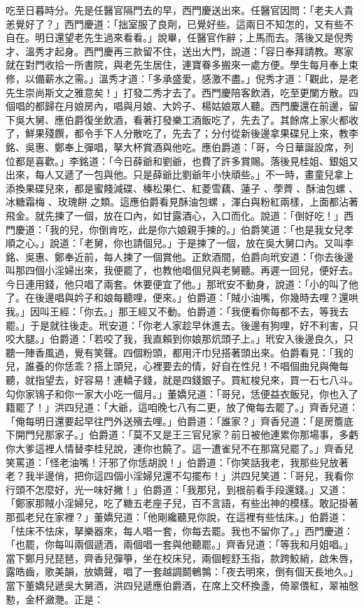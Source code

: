吃至日暮時分。先是任醫官隔門去的早，西門慶送出來。任醫官因問：「老夫人貴恙覺好了？」西門慶道：「拙室服了良劑，已覺好些。這兩日不知怎的，又有些不自在。明日還望老先生過來看看。」說畢，任醫官作辭；上馬而去。落後又是倪秀才、溫秀才起身。西門慶再三款留不住，送出大門，說道：「容日奉拜請教。寒家就在對門收拾一所書院，與老先生居住，連寶眷多搬來一處方便。學生每月奉上束修，以備薪水之需。」溫秀才道：「多承盛愛，感激不盡。」倪秀才道：「觀此，是老先生崇尚斯文之雅意矣！」打發二秀才去了。西門慶陪客飲酒，吃至更闌方散。四個唱的都歸在月娘房內，唱與月娘、大妗子、楊姑娘眾人聽。西門慶還在前邊，留下吳大舅、應伯爵復坐飲酒，看著打發樂工酒飯吃了，先去了。其餘席上家火都收了，鮮果殘饌，都令手下人分散吃了，先去了；分付從新後邊拿果碟兒上來，教李銘、吳惠、鄭奉上彈唱，拏大杯賞酒與他吃。應伯爵道：「哥，今日華誕設席，列位都是喜歡。」李銘道：「今日薛爺和劉爺，也費了許多賞賜。落後見桂姐、銀姐又出來，每人又遞了一包與他。只是薛爺比劉爺年小快頑些。」不一時，畫童兒拿上添換果碟兒來，都是蜜餞減碟、榛松果仁、紅菱雪藕、蓮子 、荸薺 、酥油包螺 、冰糖霜梅 、玫瑰餅 之類。這應伯爵看見酥油包螺 ，渾白與粉紅兩樣，上面都沾著飛金。就先揀了一個，放在口內，如甘露酒心，入口而化。說道：「倒好吃！」西門慶道：「我的兒，你倒肯吃，此是你六娘親手揀的。」伯爵笑道：「也是我女兒孝順之心。」說道：「老舅，你也請個兒。」于是揀了一個，放在吳大舅口內。又叫李銘、吳惠、鄭奉近前，每人揀了一個賞他。正飲酒間，伯爵向玳安道：「你去後邊叫那四個小淫婦出來，我便罷了，也教他唱個兒與老舅聽。再遲一回兒，便好去。今日連用錢，他只唱了兩套。休要便宜了他。」那玳安不動身，說道：「小的叫了他了。在後邊唱與妗子和娘每聽哩，便來。」伯爵道：「賊小油嘴，你幾時去哩？還哄我。」因叫王經：「你去。」那王經又不動。伯爵道：「我便看你每都不去，等我去罷。」于是就往後走。玳安道：「你老人家趁早休進去。後邊有狗哩，好不利害，只咬大腿。」伯爵道：「若咬了我，我直賴到你娘那炕頭子上。」玳安入後邊良久，只聽一陣香風過，覺有笑聲。四個粉頭，都用汗巾兒搭著頭出來。伯爵看見：「我的兒，誰養的你恁乖？搭上頭兒，心裡要去的情，好自在性兒！不唱個曲兒與俺每聽，就指望去，好容易！連轎子錢，就是四錢銀子。買紅梭兒來，買一石七八斗。勾你家鴇子和你一家大小吃一個月。」董嬌兒道：「哥兒，恁便益衣飯兒，你也入了籍罷了！」洪四兒道：「大爺，這咱晚七八有二更，放了俺每去罷了。」齊香兒道：「俺每明日還要起早往門外送殯去哩。」伯爵道：「誰家？」齊香兒道：「是房簷底下開門兒那家子。」伯爵道：「莫不又是王三官兒家？前日被他連累你那場事，多虧你大爹這裡人情替李桂兒說，連你也饒了。這一遭雀兒不在那窩兒罷了。」齊香兒笑罵道：「怪老油嘴！汗邪了你恁胡說！」伯爵道：「你笑話我老，我那些兒放著老？我半邊俏，把你這四個小淫婦兒還不勾擺布！」洪四兒笑道：「哥兒，我看你行頭不怎麼好，光一味好撇！」伯爵道：「我那兒，到根前看手段還錢。」又道：「鄭家那賊小淫婦兒，吃了糖五老座子兒，百不言語，有些出神的模樣。敢記掛著那孤老兒在家裡？」董嬌兒道：「他剛纔聽見你說，在這裡有些怯床。」伯爵道：「怯床不怯床，拏樂器來，每人唱一套，你每去罷。我也不留你了。」西門慶道：「也罷，你每叫兩個遞酒，兩個唱一套與他聽罷。」齊香兒道：「等我和月姐唱。」當下鄭月兒琵琶，齊香兒彈箏，坐在校床兒，兩個輕舒玉指，款跨鮫綃，啟朱唇，露皓齒，歌美韻，放嬌聲，唱了一套越調鬬鵪鶉：「夜去明來，倒有個天長地久。」當下董嬌兒遞吳大舅酒，洪四兒遞應伯爵酒，在席上交杯換盞，倚翠偎紅，翠袖慇懃，金杯瀲灧。正是：

